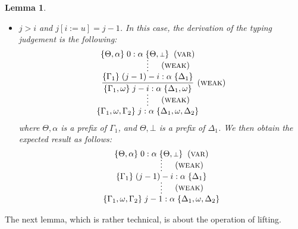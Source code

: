 \documentclass[submission,creativecommons]{eptcs}
\newtheorem{lemma}{Lemma}
\newcommand{\mybox}{\raisebox{3.5pt}{\framebox[7pt]{\rule{0mm}{0.3pt}}}}
\def\qed{\ifmmode\mybox\else{\unskip\nobreak\hfil
\penalty50\hskip1em\null\nobreak\hfil\mybox
\parfillskip=0pt\finalhyphendemerits=0\endgraf}\fi}
\newenvironment{proof}{%

\vspace{.7ex}
\noindent{\it Proof.} \rm}{\qed}
\newcommand{\bt}{{\scriptstyle\bot}}
\newcommand{\sbstt}[3]{#1[#2 := #3]}
\newcommand{\tytm}[4]{\{#1\}\;#2:#3\;\{#4\}}
\begin{document}
\begin{lemma}
\begin{proof}
\begin{itemize}
\item $j > i$ and $\sbstt{j}{i}{u} = j - 1$.\quad
In this case, the derivation of the typing judgement is the following:
\begin{align*}
\infer*[\quad\mbox{(\textsc{weak})}]{
\tytm{\Gamma_1, \omega, \Gamma_2}{j}{\alpha}{\Delta_1, \omega, \Delta_2}
}{
\infer[\mbox{(\textsc{weak})}]{
\tytm{\Gamma_1, \omega}{j-i}{\alpha}{\Delta_1, \omega}
}{
\infer*[\mbox{\quad(\textsc{weak})}]{
\tytm{\Gamma_1}{(j-1)-i}{\alpha}{\Delta_1}
}{
\tytm{\Theta,\alpha}{0}{\alpha}{\Theta,\bt}\;\; \mbox{(\textsc{var})}
}}}
\end{align*}
where $\Theta,\alpha$ is a prefix of $\Gamma_1$, and $\Theta, \bt$ is a prefix of $\Delta_1$.
We then obtain the expected result as follows:
\begin{align*}
\infer*[\quad\mbox{(\textsc{weak})}]{
\tytm{\Gamma_1, \omega, \Gamma_2}{j-1}{\alpha}{\Delta_1, \omega, \Delta_2}
}{
\infer*[\mbox{\quad(\textsc{weak})}]{
\tytm{\Gamma_1}{(j-1)-i}{\alpha}{\Delta_1}
}{
\tytm{\Theta,\alpha}{0}{\alpha}{\Theta,\bt}\;\; \mbox{(\textsc{var})}
}}
\end{align*}
\end{itemize}
\end{proof}
\end{lemma}

The next lemma, which is rather technical, is about the operation of lifting.
\end{document}
